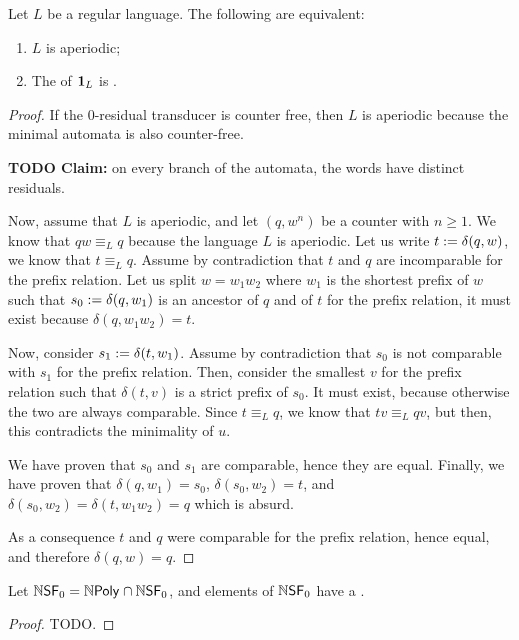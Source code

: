 \begin{lemma}
    \label{aperiodic-iff-residual:lem}
    Let $L$ be a regular language.
    The following are equivalent:
    \begin{enumerate}
        \item $L$ is aperiodic;
        \item The  of $\mathbf{1}_{L}$
            is .
    \end{enumerate}
\end{lemma}
\begin{proof}
    If the $0$-residual transducer is counter free,
    then $L$ is aperiodic because the minimal automata is also counter-free.

    \textbf{TODO Claim:}
    on every branch of the automata, the words have distinct residuals.

    Now, assume that $L$ is aperiodic, and let $(q,w^n)$ be a counter with $n
    \geq 1$. We know that $qw \equiv_L q$ because the language $L$ is
    aperiodic. Let us write $t \mathrel{:=} \delta(q,w)$, we know that $t \equiv_L
    q$. Assume by contradiction that $t$ and $q$ are incomparable for the
    prefix relation. Let us split $w = w_1 w_2$ where $w_1$ is the shortest
    prefix of $w$ such that $s_0 \mathrel{:=} \delta(q,w_1)$ is an ancestor of $q$
    and of $t$ for the prefix relation, it must exist because $\delta(q,w_1
    w_2) = t$.

    Now, consider $s_1 \mathrel{:=} \delta(t, w_1)$. Assume by contradiction that
    $s_0$ is not comparable with $s_1$ for the prefix relation. Then, consider
    the smallest $v$ for the prefix relation such that $\delta(t, v)$ is a
    strict prefix of $s_0$. It must exist, because otherwise the two are always
    comparable. Since $t \equiv_L q$, we know that $tv \equiv_L qv$, but then,
    this contradicts the minimality of $u$.

    We have proven that $s_0$ and $s_1$ are comparable, hence they
    are equal.
    Finally, we have proven that $\delta(q, w_1) = s_0$,
    $\delta(s_0, w_2) = t$, and $\delta(s_0, w_2) = \delta(t, w_1w_2) = q$ which is absurd.

    As a consequence $t$ and $q$ were comparable for the prefix relation,
    hence equal, and therefore $\delta(q, w) = q$.
\end{proof}

\begin{lemma}
    Let $\NSF[0] = \NPoly \cap \NSF[0]$,
    and elements of $\NSF[0]$
    have a  .
\end{lemma}
\begin{proof}
    TODO.
\end{proof}


